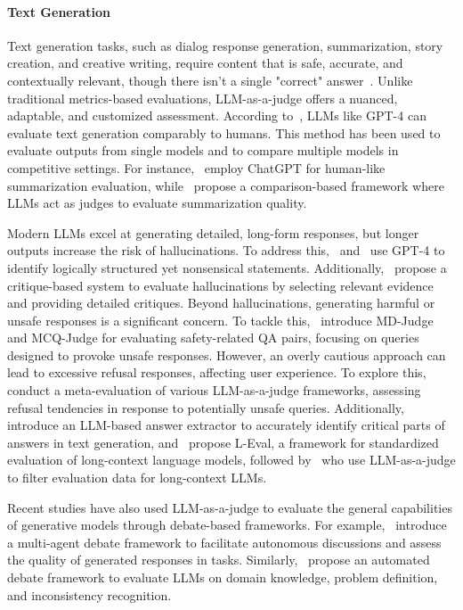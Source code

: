 \paragraph{\textbf{Text Generation}} 
Text generation tasks, such as dialog response generation, summarization, story creation, and creative writing, require content that is safe, accurate, and contextually relevant, though there isn't a single "correct" answer~\cite{badshah2024reference, bermejo2024enhancing}. Unlike traditional metrics-based evaluations, LLM-as-a-judge offers a nuanced, adaptable, and customized assessment. According to~\citet{nips_llm_as_a_judge}, LLMs like GPT-4 can evaluate text generation comparably to humans. This method has been used to evaluate outputs from single models and to compare multiple models in competitive settings. For instance,~\citet{human_like_summarization} employ ChatGPT for human-like summarization evaluation, while~\citet{wu2023large} propose a comparison-based framework where LLMs act as judges to evaluate summarization quality.

Modern LLMs excel at generating detailed, long-form responses, but longer outputs increase the risk of hallucinations. To address this,~\citet{cheng2023evaluating} and~\citet{zhang2024balancing} use GPT-4 to identify logically structured yet nonsensical statements. Additionally,~\citet{wang2024halu} propose a critique-based system to evaluate hallucinations by selecting relevant evidence and providing detailed critiques. Beyond hallucinations, generating harmful or unsafe responses is a significant concern. To tackle this,~\citet{salad_bench} introduce MD-Judge and MCQ-Judge for evaluating safety-related QA pairs, focusing on queries designed to provoke unsafe responses. However, an overly cautious approach can lead to excessive refusal responses, affecting user experience. To explore this,~\citet{xie2024sorry} conduct a meta-evaluation of various LLM-as-a-judge frameworks, assessing refusal tendencies in response to potentially unsafe queries. Additionally,~\citet{yu2024xfinder} introduce an LLM-based answer extractor to accurately identify critical parts of answers in text generation, and~\citet{an2023eval} propose L-Eval, a framework for standardized evaluation of long-context language models, followed by~\citet{bai2024longbench} who use LLM-as-a-judge to filter evaluation data for long-context LLMs.

Recent studies have also used LLM-as-a-judge to evaluate the general capabilities of generative models through debate-based frameworks. For example,~\citet{chanchateval} introduce a multi-agent debate framework to facilitate autonomous discussions and assess the quality of generated responses in tasks. Similarly,~\citet{moniri2024evaluating} propose an automated debate framework to evaluate LLMs on domain knowledge, problem definition, and inconsistency recognition.


